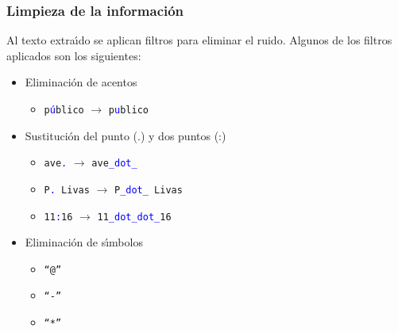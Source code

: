 \documentclass{beamer}
\begin{document}
\begin{frame}
  \frametitle{Limpieza de la informaci\'{o}n}
  Al texto extra\'{\i}do se aplican filtros para eliminar el ruido. Algunos de los filtros aplicados son los siguientes:
  \vspace{2 mm}
      
  \begin{itemize}
  \item Eliminaci\'{o}n de acentos
    \begin{itemize}
    \item \texttt{p\textcolor{blue}{\'{u}}blico} $\rightarrow$ \texttt{p\textcolor{blue}{u}blico}
    \end{itemize}
    \vspace{2 mm}

  \item Sustituci\'{o}n del punto (.) y dos puntos (:)
    \begin{itemize}
    \item \texttt{ave\textcolor{blue}{.}} $\rightarrow$ \texttt{ave\textcolor{blue}{\_dot\_}}
    \item \texttt{P\textcolor{blue}{.} Livas} $\rightarrow$ \texttt{P\textcolor{blue}{\_dot\_} Livas}
    \item \texttt{11\textcolor{blue}{:}16} $\rightarrow$ \texttt{11\textcolor{blue}{\_dot\_dot\_}16}
    \end{itemize}
    \vspace{2 mm}  

  \item Eliminaci\'{o}n de s\'{\i}mbolos
    \begin{itemize}
    \item \texttt{``@''}
    \item \texttt{``-''}
    \item \texttt{``*''}
    \end{itemize}
  \end{itemize}
\end{frame}
\end{document}
